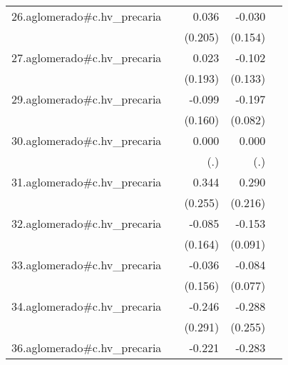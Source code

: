 {\begin{longtable}{l*{4}{D{.}{.}{-1}}}
\addlinespace
26.aglomerado#c.hv\_precaria&                     &       0.036         &      -0.030         &                     \\
            &                     &     (0.205)         &     (0.154)         &                     \\
\addlinespace
27.aglomerado#c.hv\_precaria&                     &       0.023         &      -0.102         &                     \\
            &                     &     (0.193)         &     (0.133)         &                     \\
\addlinespace
29.aglomerado#c.hv\_precaria&                     &      -0.099         &      -0.197\sym{*}  &                     \\
            &                     &     (0.160)         &     (0.082)         &                     \\
\addlinespace
30.aglomerado#c.hv\_precaria&                     &       0.000         &       0.000         &                     \\
            &                     &         (.)         &         (.)         &                     \\
\addlinespace
31.aglomerado#c.hv\_precaria&                     &       0.344         &       0.290         &                     \\
            &                     &     (0.255)         &     (0.216)         &                     \\
\addlinespace
32.aglomerado#c.hv\_precaria&                     &      -0.085         &      -0.153         &                     \\
            &                     &     (0.164)         &     (0.091)         &                     \\
\addlinespace
33.aglomerado#c.hv\_precaria&                     &      -0.036         &      -0.084         &                     \\
            &                     &     (0.156)         &     (0.077)         &                     \\
\addlinespace
34.aglomerado#c.hv\_precaria&                     &      -0.246         &      -0.288         &                     \\
            &                     &     (0.291)         &     (0.255)         &                     \\
\addlinespace
36.aglomerado#c.hv\_precaria&                     &      -0.221         &      -0.283\sym{*}  &                     \\

\end{longtable}}
